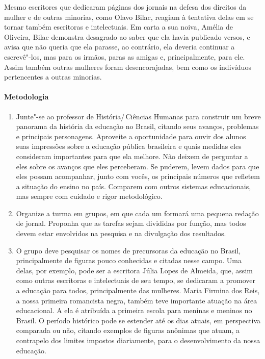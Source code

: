 \documentclass[12pt]{extarticle}
\begin{document}
Mesmo escritores que dedicaram páginas dos jornais na defesa dos
direitos da mulher e de outras minorias, como Olavo Bilac, reagiam à
tentativa delas em se tornar também escritoras e intelectuais. Em carta
a sua noiva, Amélia de Oliveira, Bilac demonstra desagrado ao saber que
ela havia publicado versos, e avisa que não queria que ela parasse, ao
contrário, ela deveria continuar a escrevê"-los, mas para os irmãos,
paras as amigas e, principalmente, para ele. Assim também outras
mulheres foram desencorajadas, bem como os indivíduos pertencentes a
outras minorias.

\paragraph{Metodologia} 
\begin{enumerate}
\item
Junte"-se ao professor de História/\,Ciências Humanas para construir 
um breve panorama da história da
educação no Brasil, citando seus avanços, problemas e principais
personagens. Aproveite a oportunidade para ouvir dos alunos suas
impressões sobre a educação pública brasileira e quais medidas eles
consideram importantes para que ela melhore. Não deixem de perguntar a
eles sobre os avanços que eles perceberam. Se puderem, levem dados
para que eles possam acompanhar, junto com vocês,
os principais números que refletem a situação do ensino no país. Comparem
com outros sistemas educacionais, mas sempre com cuidado e rigor
metodológico.

\item
Organize a turma em grupos, em que cada um formará uma pequena
redação de jornal. Proponha que as tarefas sejam divididas por função,
mas todos devem estar envolvidos na pesquisa e na divulgação dos
resultados.

\item
O grupo deve pesquisar os nomes de precursoras da educação no Brasil,
principalmente de figuras pouco conhecidas e citadas nesse campo. Uma
delas, por exemplo, pode ser a escritora Júlia Lopes de Almeida, que,
assim como outras escritoras e intelectuais de seu tempo, se dedicaram a
promover a educação para todos, principalmente das mulheres. Maria
Firmina dos Reis, a nossa primeira romancista negra, também teve
importante atuação na área educacional. A ela é atribuída a primeira
escola para meninas e meninos no Brasil. O período histórico pode se
estender até os dias atuais, em perspectiva comparada ou não, citando
exemplos de figuras anônimas que atuam, a contrapelo dos limites
impostos diariamente, para o desenvolvimento da nossa educação.


\end{enumerate}
\end{document}
